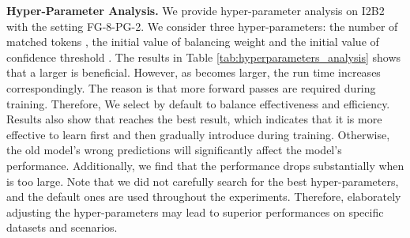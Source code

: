 \documentclass[11pt]{article}
\begin{document}
\begin{table}[htbp]
  \centering
  \caption{Hyper-parameter analysis on I2B2 (FG-8-PG-2). \textit{Mi-F1}: micro-F1; \textit{Ma-F1}: macro-F1.}
  \label{tab:hyperparameters_analysis}\end{table}

\noindent\textbf{Hyper-Parameter Analysis.}\quad
We provide hyper-parameter analysis on I2B2 with the setting FG-8-PG-2.
We consider three hyper-parameters: the number of matched tokens , the initial value of balancing weight  and the initial value of confidence threshold .
The results in Table \ref{tab:hyperparameters_analysis} shows that a larger  is beneficial.
However, as  becomes larger, the run time increases correspondingly.
The reason is that more forward passes are required during training.
Therefore, We select  by default to balance effectiveness and efficiency.
Results also show that  reaches the best result, which indicates that it is more effective to learn  first and then gradually introduce  during training.
Otherwise, the old model's wrong predictions will significantly affect the model's performance.
Additionally, we find that the performance drops substantially when  is too large. 
Note that we did not carefully search for the best hyper-parameters, and the default ones are used throughout the experiments.
Therefore, elaborately adjusting the hyper-parameters may lead to superior performances on specific datasets and scenarios.
\end{document}
